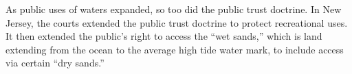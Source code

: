 
As public uses of waters expanded, so too did the public trust doctrine. In New
Jersey, the courts extended the public trust doctrine to protect recreational
uses. It then extended the public's right to access the ``wet sands,'' which is
land extending from the ocean to the average high tide water mark, to include
access via certain ``dry sands.'' 

